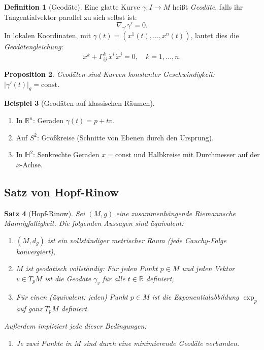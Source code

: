 \documentclass[12pt,a4paper]{amsart}
\newtheorem{theorem}{Satz}[section]
\newtheorem{proposition}[theorem]{Proposition}
\theoremstyle{definition}
\newtheorem{definition}[theorem]{Definition}
\newtheorem{beispiel}[theorem]{Beispiel}
\begin{document}
\begin{definition}[Geodäte]
Eine glatte Kurve $\gamma: I \to M$ heißt \emph{Geodäte}, falls ihr
Tangentialvektor parallel zu sich selbst ist:
\[
  \nabla_{\gamma'}\gamma' = 0.
\]
In lokalen Koordinaten, mit $\gamma(t) = (x^1(t), \ldots, x^n(t))$,
lautet dies die \emph{Geodätengleichung}:
\[
  \ddot{x}^k + \Gamma^k_{ij}\,\dot{x}^i\,\dot{x}^j = 0,
  \quad k = 1, \ldots, n.
\]
\end{definition}

\begin{proposition}
Geodäten sind Kurven konstanter Geschwindigkeit: $|\gamma'(t)|_g = \mathrm{const}$.
\end{proposition}

\begin{beispiel}[Geodäten auf klassischen Räumen]
\begin{enumerate}[label=(\alph*)]
  \item In $\mathbb{R}^n$: Geraden $\gamma(t) = p + tv$.
  \item Auf $S^2$: Großkreise (Schnitte von Ebenen durch den Ursprung).
  \item In $\mathbb{H}^2$: Senkrechte Geraden $x = \mathrm{const}$ und
        Halbkreise mit Durchmesser auf der $x$-Achse.
\end{enumerate}
\end{beispiel}

\subsection{Satz von Hopf-Rinow}

\begin{theorem}[Hopf-Rinow]
\label{thm:hopf-rinow}
Sei $(M, g)$ eine zusammenhängende Riemannsche Mannigfaltigkeit.
Die folgenden Aussagen sind äquivalent:
\begin{enumerate}[label=(\roman*)]
  \item $(M, d_g)$ ist ein vollständiger metrischer Raum (jede Cauchy-Folge konvergiert),
  \item $M$ ist \emph{geodätisch vollständig}: Für jeden Punkt $p \in M$ und jeden
        Vektor $v \in T_pM$ ist die Geodäte $\gamma_v$ für alle $t \in \mathbb{R}$
        definiert,
  \item Für einen (äquivalent: jeden) Punkt $p \in M$ ist die Exponentialabbildung
        $\exp_p$ auf ganz $T_pM$ definiert.
\end{enumerate}
Außerdem impliziert jede dieser Bedingungen:
\begin{enumerate}[label=(\alph*)]
  \item Je zwei Punkte in $M$ sind durch eine minimierende Geodäte verbunden.
\end{enumerate}
\end{theorem}
\end{document}
